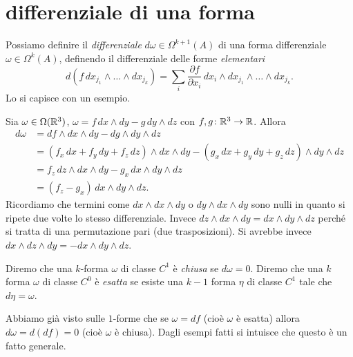 \section{differenziale di una forma}

Possiamo definire il \emph{differenziale} $d\omega\in \Omega^{k+1}(A)$ 
di una forma differenziale $\omega\in \Omega^k(A)$, 
definendo il differenziale delle forme \emph{elementari}
\[
  d( f\, dx_{j_1} \wedge \dots  \wedge dx_{j_k})
  = \sum_i \frac{\partial f}{\partial x_i}\, dx_i \wedge dx_{j_1} \wedge \dots \wedge dx_{j_k}.
\]
Lo si capisce con un esempio.

\begin{example}
Sia $\omega\in \Omega({\mathbb R}^3)$, $\omega = f\, dx \wedge dy - g\, dy\wedge dz$ 
con $f,g\colon {\mathbb R}^3\to {\mathbb R}$.
Allora 
\begin{align*}
  d\omega 
  &= df \wedge dx \wedge dy - dg \wedge dy \wedge dz\\
  &= (f_x\, dx + f_y\, dy + f_z\, dz) \wedge dx \wedge dy - (g_x\, dx + g_y\, dy + g_z\, dz)\wedge dy \wedge dz\\
  &= f_z\, dz\wedge dx \wedge dy - g_x\, dx \wedge dy \wedge dz \\
  &= (f_z - g_x)\, dx \wedge dy \wedge dz.
\end{align*}
Ricordiamo che termini come $dx\wedge dx \wedge dy$ o $dy \wedge dx \wedge dy$ sono nulli in quanto 
si ripete due volte lo stesso differenziale. 
Invece $dz\wedge dx \wedge dy = dx \wedge dy \wedge dz$ perché si tratta di una permutazione 
pari (due trasposizioni). Si avrebbe invece $dx\wedge dz\wedge dy = - dx\wedge dy\wedge dz$.
\end{example} 

\begin{definition}
Diremo che una $k$-forma $\omega$ di classe $C^1$ è \emph{chiusa} 
se $d\omega = 0$. Diremo che una $k$ forma $\omega$ di classe $C^0$ 
è \emph{esatta} se esiste una $k-1$ forma $\eta$ di classe $C^1$ 
tale che $d\eta = \omega$.
\end{definition}

Abbiamo già visto sulle $1$-forme che se $\omega = df$ (cioè $\omega$ è esatta) 
allora $d\omega = d(df) = 0$ (cioè $\omega$ è chiusa).
Dagli esempi fatti si intuisce che questo è un fatto generale.

